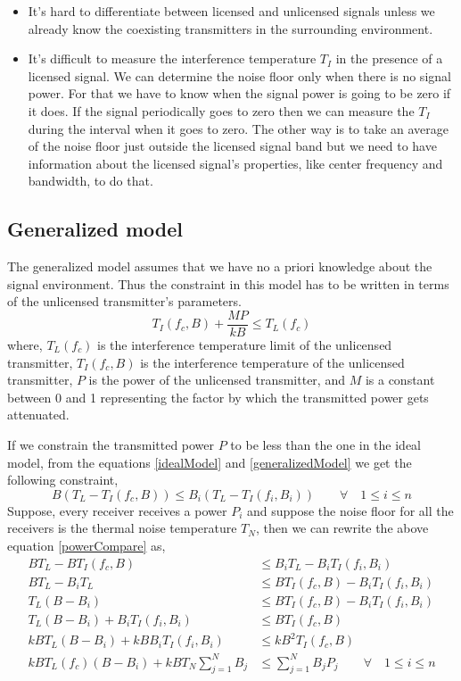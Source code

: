 \documentclass[12pt]{article}
\begin{document}
\begin{itemize}
    \item It's hard to differentiate between licensed and unlicensed signals unless we already know the coexisting transmitters in the surrounding environment.
    \item It's difficult to measure the interference temperature $T_I$ in the presence of a licensed signal. We can determine the noise floor only when there is no signal power. For that we have to know when the signal power is going to be zero if it does. If the signal periodically goes to zero then we can measure the $T_I$ during the interval when it goes to zero. The other way is to take an average of the noise floor just outside the licensed signal band but we need to have information about the licensed signal's properties, like center frequency and bandwidth, to do that.
\end{itemize}


\subsection*{Generalized model}

The generalized model assumes that we have no a priori knowledge about the signal environment. Thus the constraint in this model has to be written in terms of the unlicensed transmitter's parameters.
\begin{equation}
    T_I(f_c,B) + \frac{MP}{kB} \leq T_L(f_c) \label{generalizedModel}
\end{equation}
where, $T_L(f_c)$ is the interference temperature limit of the unlicensed transmitter,
$T_I(f_c,B)$ is the interference temperature of the unlicensed transmitter, $P$ is the power of the unlicensed transmitter, and $M$ is a constant between 0 and 1 representing the factor by which the transmitted power gets attenuated.

If we constrain the transmitted power $P$ to be less than the one in the ideal model, from the equations \eqref{idealModel} and \eqref{generalizedModel} we get the following constraint,
\begin{equation}
    B(T_L - T_I(f_c,B)) \leq  B_i(T_L - T_I(f_i,B_i)) \qquad \forall \quad 1 \leq i \leq n \label{powerCompare}
\end{equation}
Suppose, every receiver receives a power $P_i$ and suppose the noise floor for all the receivers is the thermal noise temperature $T_N$, then we can rewrite the above equation \eqref{powerCompare} as,
\begin{align}
    BT_L - BT_I(f_c,B) & \leq  B_iT_L - B_iT_I(f_i,B_i) \nonumber\\  
    BT_L - B_iT_L & \leq BT_I(f_c,B) - B_iT_I(f_i,B_i) \nonumber\\  
    T_L(B- B_i) & \leq BT_I(f_c,B) - B_iT_I(f_i,B_i) \nonumber\\  
    T_L(B - B_i) + B_iT_I(f_i,B_i) & \leq  BT_I(f_c,B) \nonumber\\
    kBT_L(B - B_i) + kBB_iT_I(f_i,B_i) & \leq kB^2T_I(f_c,B) \nonumber\\  
    kBT_L(f_c)(B-B_i) + kBT_N\sum_{j=1}^{N}B_j & \leq \sum_{j=1}^{N}B_jP_j \qquad \forall \quad 1 \leq i\leq n
\end{align}
\end{document}
